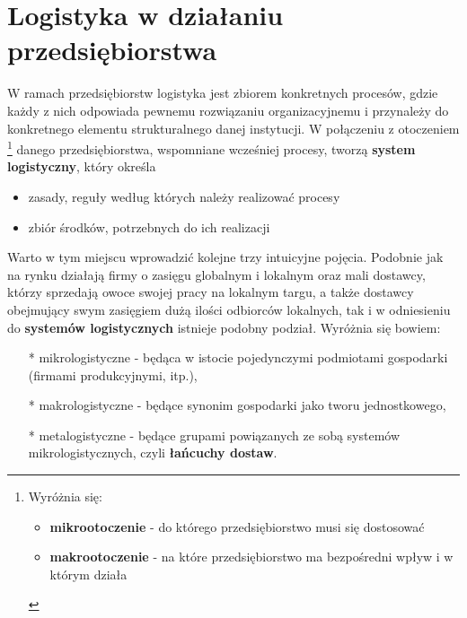 \section{Logistyka w działaniu przedsiębiorstwa}  
	W ramach przedsiębiorstw logistyka jest zbiorem konkretnych procesów, 
	gdzie każdy z nich odpowiada pewnemu rozwiązaniu organizacyjnemu i przynależy do konkretnego 
	elementu strukturalnego danej instytucji. W połączeniu z otoczeniem
	\footnote{
		Wyróżnia się:
		\begin{itemize}
			\item \textbf{mikrootoczenie} - do którego przedsiębiorstwo musi się dostosować
			\item \textbf{makrootoczenie} - na które przedsiębiorstwo ma bezpośredni wpływ i w którym działa
		\end{itemize}			
	}
	danego przedsiębiorstwa, wspomniane wcześniej procesy, tworzą \textbf{system logistyczny}, który określa
	\begin{itemize}
		\item zasady, reguły według których należy realizować procesy
		\item zbiór środków, potrzebnych do ich realizacji
	\end{itemize}
	Warto w tym miejscu wprowadzić kolejne trzy intuicyjne pojęcia. Podobnie jak na rynku
	działają firmy o zasięgu globalnym i lokalnym oraz mali dostawcy, którzy sprzedają
	owoce swojej pracy na lokalnym targu, a także dostawcy obejmujący swym zasięgiem dużą ilości
	odbiorców lokalnych, tak i w odniesieniu do \textbf{systemów logistycznych}
	istnieje podobny podział. Wyróżnia się bowiem:
	\begin{itemize}
		\item[*] mikrologistyczne 	- będąca w istocie pojedynczymi podmiotami gospodarki (firmami produkcyjnymi, itp.),
		\item[*] makrologistyczne 	- będące synonim gospodarki jako tworu jednostkowego,
		\item[*] metalogistyczne	- będące grupami powiązanych ze sobą systemów mikrologistycznych, 
		czyli \textbf{łańcuchy dostaw}\cite{systemy_logistyczne_podstawy_funkcjonowania}.
	\end{itemize}

